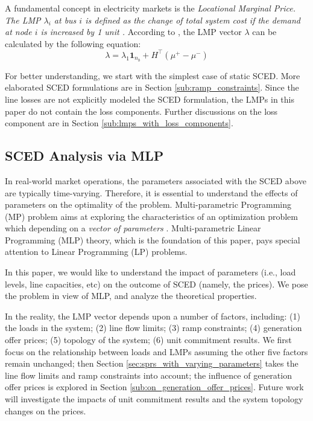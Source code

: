 \documentclass[letterpaper, 11pt]{article}
\theoremstyle{plain}
\theoremstyle{definition}
\begin{document}
A fundamental concept in electricity markets is the \emph{Locational Marginal Price. The LMP $\lambda_i$ at bus $i$ is defined as the change of total system cost if the demand at node $i$ is increased by 1 unit \cite{Kirschen2005}.} According to \cite{Wu1996}, the LMP vector $\lambda$ can be calculated by the following equation:
\begin{equation}
\label{eqn:LMP}
\lambda = \lambda_1 \mathbf{1}_{n_b} + H^\intercal (\mu^+ - \mu^-)
\end{equation}



For better understanding, we start with the simplest case of
static SCED. More elaborated SCED formulations are in Section
\ref{sub:ramp_constraints}. Since the line losses are not explicitly modeled the
SCED formulation, the LMPs in this paper do not contain the
loss components. Further discussions on the loss component
are in Section \ref{sub:lmps_with_loss_components}.


\subsection{SCED Analysis via MLP} \label{sub:SCED_analysis_via_MLP}
In real-world market operations, the parameters associated with the SCED above are typically time-varying. Therefore, it is essential to 
understand the effects of parameters on the optimality of the problem. Multi-parametric Programming (MP) problem aims at exploring the characteristics of an optimization problem which depending on a \emph{vector of parameters} \cite{Borrelli2003}. Multi-parametric Linear Programming (MLP) theory, which is the foundation of this paper, pays special attention to Linear Programming (LP) problems.


In this paper, we would like to understand the impact of parameters (i.e., load levels, line capacities, etc) on the outcome of SCED (namely, the prices). We pose the problem in view of MLP, and analyze the theoretical properties.


In the reality, the LMP vector depends upon a number of factors, including: (1) the loads in the system; (2) line flow limits; (3) ramp constraints; (4) generation offer prices; (5) topology of the system; (6) unit commitment results. We first focus on the relationship between loads and LMPs assuming the other five factors remain unchanged; then Section \ref{sec:sprs_with_varying_parameters} takes the line flow limits and ramp constraints into account; the influence of generation offer prices is explored in Section \ref{sub:on_generation_offer_prices}. Future work will investigate the impacts of unit commitment results and the system topology changes on the prices.
\end{document}
